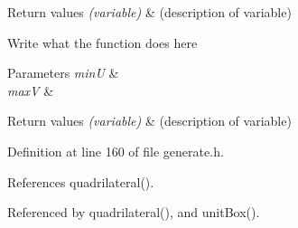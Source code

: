 \begin{DoxyRetVals}{Return values}
{\em (variable)} & (description of variable) \\
\hline
\end{DoxyRetVals}
Write what the function does here


\begin{DoxyParams}{Parameters}
{\em min\+U} & \\
\hline
{\em max\+V} & \\
\hline
\end{DoxyParams}

\begin{DoxyRetVals}{Return values}
{\em (variable)} & (description of variable)\\
\hline
\end{DoxyRetVals}


Definition at line 160 of file generate.\+h.



References quadrilateral().



Referenced by quadrilateral(), and unit\+Box().


